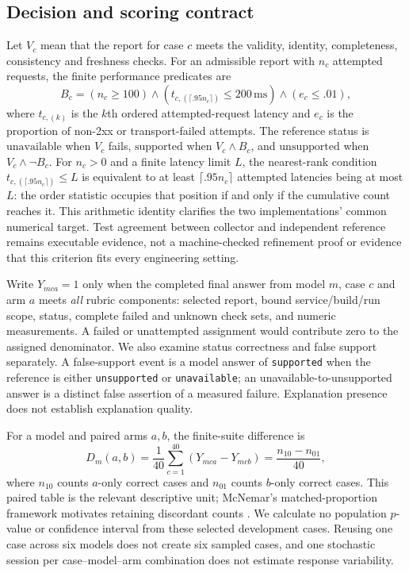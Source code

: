 \documentclass[11pt,a4paper]{article}
\newcommand{\code}[1]{\texttt{#1}}
\begin{document}
\subsection{Decision and scoring contract}
Let $V_c$ mean that the report for case $c$ meets the validity, identity, completeness, consistency and freshness checks. For an admissible report with $n_c$ attempted requests, the finite performance predicates are
\begin{equation}
  B_c=\left(n_c\geq100\right)\land
  \left(t_{c,(\lceil .95 n_c\rceil)}\leq200\,\mathrm{ms}\right)\land
  \left(e_c\leq .01\right),
  \label{eq:criterion}
\end{equation}
where $t_{c,(k)}$ is the $k$th ordered attempted-request latency and $e_c$ is the proportion of non-2xx or transport-failed attempts. The reference status is $\mathrm{unavailable}$ when $V_c$ fails, $\mathrm{supported}$ when $V_c\land B_c$, and $\mathrm{unsupported}$ when $V_c\land\neg B_c$. For $n_c>0$ and a finite latency limit $L$, the nearest-rank condition $t_{c,(\lceil .95n_c\rceil)}\leq L$ is equivalent to at least $\lceil .95n_c\rceil$ attempted latencies being at most $L$: the order statistic occupies that position if and only if the cumulative count reaches it. This arithmetic identity clarifies the two implementations' common numerical target. Test agreement between collector and independent reference remains executable evidence, not a machine-checked refinement proof or evidence that this criterion fits every engineering setting.

Write $Y_{mca}=1$ only when the completed final answer from model $m$, case $c$ and arm $a$ meets \emph{all} rubric components: selected report, bound service/build/run scope, status, complete failed and unknown check sets, and numeric measurements. A failed or unattempted assignment would contribute zero to the assigned denominator. We also examine status correctness and false support separately. A false-support event is a model answer of \code{supported} when the reference is either \code{unsupported} or \code{unavailable}; an unavailable-to-unsupported answer is a distinct false assertion of a measured failure. Explanation presence does not establish explanation quality.

For a model and paired arms $a,b$, the finite-suite difference is
\begin{equation}
 D_m(a,b)=\frac{1}{40}\sum_{c=1}^{40}(Y_{mca}-Y_{mcb})
          =\frac{n_{10}-n_{01}}{40},
 \label{eq:paired}
\end{equation}
where $n_{10}$ counts $a$-only correct cases and $n_{01}$ counts $b$-only correct cases. This paired table is the relevant descriptive unit; McNemar's matched-proportion framework motivates retaining discordant counts \citep{mcnemar1947}. We calculate no population $p$-value or confidence interval from these selected development cases. Reusing one case across six models does not create six sampled cases, and one stochastic session per case--model--arm combination does not estimate response variability.
\end{document}
